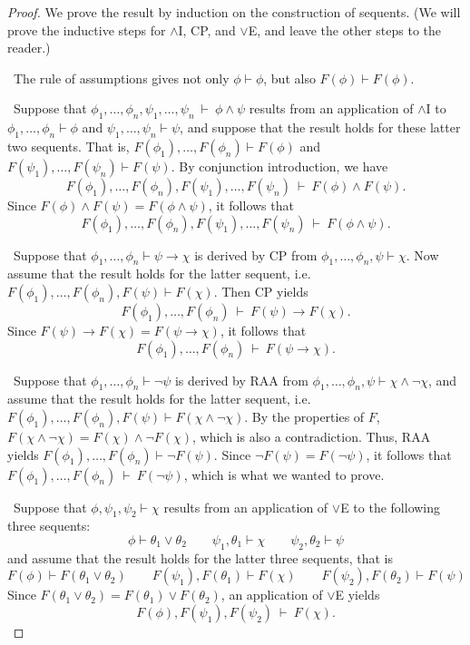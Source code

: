 \begin{proof} We prove the result by induction on the construction of
  sequents.  (We will prove the inductive steps for $\wedge$I, CP, and
  $\vee$E, and leave the other steps to the reader.)

  \bigskip \noindent {} \, The rule of assumptions gives
  not only $\phi\vdash\phi$, but also $F(\phi )\vdash F(\phi )$.

  \bigskip \noindent {} \, Suppose that
  $\phi _1,\dots ,\phi _n,\psi _1,\dots ,\psi _n\:\vdash\: \phi\wedge
  \psi$ results from an application of $\wedge$I to
  $\phi _1,\dots ,\phi _n\vdash\phi$ and
  $\psi _1,\dots ,\psi _n\vdash \psi$, and suppose that the result
  holds for these latter two sequents.  That is,
  $F(\phi _1),\dots ,F(\phi _n)\vdash F(\phi )$ and
  $F(\psi _1),\dots ,F(\psi _n)\vdash F(\psi )$.  By conjunction
  introduction, we have
   \[ F(\phi _1),\dots ,F(\phi _n),F(\psi _1),\dots
     ,F(\psi _n)\:\vdash\: F(\phi )\wedge F(\psi ) .\] Since
   $F(\phi )\wedge F(\psi )=F(\phi\wedge\psi)$, it follows that
   \[ F(\phi _1),\dots ,F(\phi _n),F(\psi _1),\dots ,F(\psi
     _n)\:\vdash\: F(\phi \wedge \psi ) .\]

   \bigskip \noindent {} \, Suppose that
   $\phi _1,\dots ,\phi _n\vdash \psi\to \chi$ is derived by CP from
   $\phi _1,\dots ,\phi _n,\psi\vdash \chi$.  Now assume that the
   result holds for the latter sequent, i.e.
   $F(\phi _1),\dots ,F(\phi _n),F(\psi )\vdash F(\chi )$.  Then CP
   yields
   \[ F(\phi _1),\dots ,F(\phi _n)\:\vdash\: F(\psi )\to F(\chi ) .\]
   Since $F(\psi )\to F(\chi )=F(\psi\to\chi )$, it follows that
   \[ F(\phi _1),\dots ,F(\phi _n)\:\vdash\: F(\psi\to\chi ) .\]

   \bigskip \noindent {} \, Suppose that
   $\phi _1,\dots ,\phi _n\vdash\neg \psi$ is derived by RAA from
   $\phi _1,\dots ,\phi _n,\psi\vdash\chi\wedge\neg\chi$, and assume
   that the result holds for the latter sequent, i.e.
   $F(\phi _1),\dots ,F(\phi _n),F(\psi )\vdash F(\chi\wedge\neg\chi
   )$.  By the properties of $F$,
   $F(\chi\wedge\neg\chi )=F(\chi )\wedge\neg F(\chi )$, which is also
   a contradiction.  Thus, RAA yields
   $F(\phi _1),\dots ,F(\phi _n)\vdash \neg F(\psi )$.  Since
   $\neg F(\psi )=F(\neg \psi)$, it follows that
   $F(\phi _1),\dots ,F(\phi _n)\:\vdash\: F(\neg \psi )$, which is
   what we wanted to prove.

   \bigskip \noindent {} \, Suppose that
   $\phi ,\psi _1,\psi _2\vdash \chi$ results from an application of
   $\vee$E to the following three sequents:
   \[ \phi\vdash \theta _1\vee\theta _2 \qquad \psi _1,\theta _1\vdash
     \chi \qquad \psi _2,\theta _2\vdash \psi \] and assume that the
   result holds for the latter three sequents, that is
   \[ F(\phi )\vdash F(\theta _1\vee\theta _2) \qquad F(\psi _1
     ),F(\theta _1 )\vdash F(\chi ) \qquad F(\psi _2),F(\theta
     _2)\vdash F(\psi ) \] Since
   $F(\theta _1\vee\theta _2)=F(\theta _1)\vee F(\theta _2)$, an
   application of $\vee$E yields
\[ F(\phi ),F(\psi _1),F(\psi _2)\:\vdash\: F(\chi ) .\]


\end{proof}
